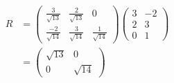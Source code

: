 \begin{align}
    R &= \begin{pmatrix}
        \frac{3}{\sqrt{13}} & \frac{2}{\sqrt{13}} & 0 \\
        \frac{-2}{\sqrt{14}} & \frac{3}{\sqrt{14}} & \frac{1}{\sqrt{14}}
    \end{pmatrix}
    \begin{pmatrix}
        3 & -2 \\ 2 & 3 \\ 0 & 1
    \end{pmatrix}\\
    &= \begin{pmatrix}
        \sqrt{13} & 0 \\
        0 & \sqrt{14}
    \end{pmatrix}
\end{align}
